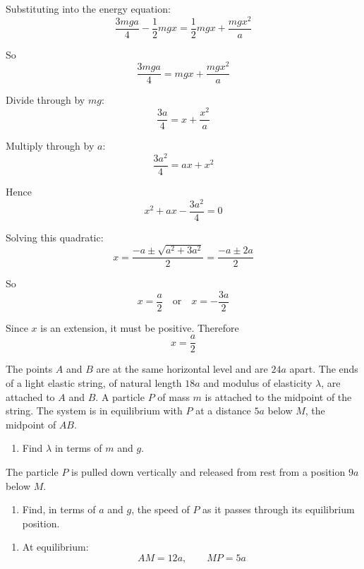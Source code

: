 \documentclass[leqno]{article}
\begin{document}
\begin{enumerate}[
  label=\textbf{\arabic*.},
  leftmargin=*,
  topsep=0pt,
  partopsep=0pt,
  parsep=0pt
]
\begin{djsSolution}
Substituting into the energy equation:
\[
\frac{3mga}{4}-\frac12 mgx=\frac12 mgx+\frac{mgx^2}{a}
\]

So
\[
\frac{3mga}{4}=mgx+\frac{mgx^2}{a}
\]

Divide through by \(mg\):
\[
\frac{3a}{4}=x+\frac{x^2}{a}
\]

Multiply through by \(a\):
\[
\frac{3a^2}{4}=ax+x^2
\]

Hence
\[
x^2+ax-\frac{3a^2}{4}=0
\]

Solving this quadratic:
\[
x=\frac{-a\pm\sqrt{a^2+3a^2}}{2}=\frac{-a\pm2a}{2}
\]

So
\[
x=\frac a2 \quad \text{or} \quad x=-\frac{3a}{2}
\]

Since \(x\) is an extension, it must be positive. Therefore
\[
x=\frac a2
\]
\end{djsSolution}


\newpage

\questionitem

The points $A$ and $B$ are at the same horizontal level and are $24a$ apart. The ends of a light elastic string, of natural length $18a$ and modulus of elasticity $\lambda$, are attached to $A$ and $B$. A particle $P$ of mass $m$ is attached to the midpoint of the string. The system is in equilibrium with $P$ at a distance $5a$ below $M$, the midpoint of $AB$. \\
\begin{enumerate}[label=\textbf{(\alph*)}]
  \item Find $\lambda$ in terms of $m$ and $g$.  \\
\end{enumerate}
The particle $P$ is pulled down vertically and released from rest from a position $9a$ below $M$. \\
\begin{enumerate}[label=\textbf{(\alph*)}, resume]
  \item Find, in terms of $a$ and $g$, the speed of $P$ as it passes through its equilibrium position.  \\
\end{enumerate}

\vspace*{10pt}

\begin{djsSolution}
\begin{enumerate}[label=\textbf{(\alph*)}, start=1]
  \item At equilibrium:
\[
AM=12a,\qquad MP=5a
\]


\end{enumerate}
\end{djsSolution}
\end{enumerate}
\end{document}
